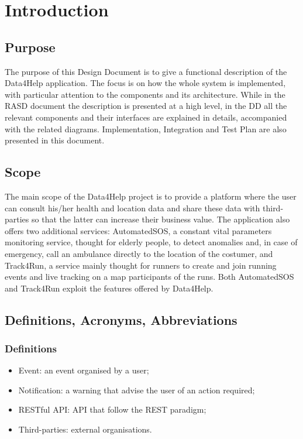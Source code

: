 \documentclass[DD.tex]{subfiles}
\begin{document}
\section{Introduction}

\subsection{Purpose}
The purpose of this Design Document is to give a functional description of the Data4Help application. The focus is on how the whole system is implemented, with particular attention to the components and its architecture. \newline
While in the RASD document the description is presented at a high level, in the DD all the relevant components and their interfaces are explained in details, accompanied with the related diagrams.
Implementation, Integration and Test Plan are also presented in this document. 

\subsection{Scope}
The main scope of the Data4Help project is to provide a platform where the user can consult his/her health and location data and share these data with third-parties so that the latter can increase their business value. \newline
The application also offers two additional services: AutomatedSOS, a constant vital parameters monitoring service, thought for elderly people, to detect anomalies and, in case of emergency, call an ambulance directly to the location of the costumer, and Track4Run, a service mainly thought for runners to create and join running events and live tracking on a map participants of the runs. \newline
Both AutomatedSOS and Track4Run exploit the features offered by Data4Help.

\subsection{Definitions, Acronyms, Abbreviations}

\subsubsection{Definitions}
\begin{itemize}
	\item Event: an event organised by a user; 
	\item Notification: a warning that advise the user of an action required;
	\item RESTful API: API that follow the REST paradigm;
	\item Third-parties: external organisations.
\end{itemize}
\end{document}
